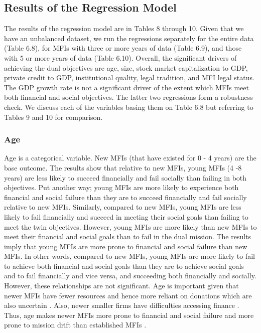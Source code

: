 \documentclass[a4paper, nobind]{templates/ociamthesis}
\begin{document}
\hypertarget{results-of-the-regression-model-1}{%
\subsection{Results of the Regression Model}\label{results-of-the-regression-model-1}}

The results of the regression model are in Tables 8 through 10. Given that we have an unbalanced dataset, we run the regressions separately for the entire data (Table 6.8), for MFIs with three or more years of data (Table 6.9), and those with 5 or more years of data (Table 6.10). Overall, the significant drivers of achieving the dual objectives are age, size, stock market capitalization to GDP, private credit to GDP, institutional quality, legal tradition, and MFI legal status. The GDP growth rate is not a significant driver of the extent which MFIs meet both financial and social objectives. The latter two regressions form a robustness check. We discuss each of the variables basing them on Table 6.8 but referring to Tables 9 and 10 for comparison.

\hypertarget{age-1}{%
\subsubsection{Age}\label{age-1}}

\noindent Age is a categorical variable. New MFIs (that have existed for 0 - 4 years) are the base outcome. The results show that relative to new MFIs, young MFIs (4 -8 years) are less likely to succeed financially and fail socially than failing in both objectives. Put another way; young MFIs are more likely to experience both financial and social failure than they are to succeed financially and fail socially relative to new MFIs. Similarly, compared to new MFIs, young MFIs are less likely to fail financially and succeed in meeting their social goals than failing to meet the twin objectives. However, young MFIs are more likely than new MFIs to meet their financial and social goals than to fail in the dual mission. The results imply that young MFIs are more prone to financial and social failure than new MFIs. In other words, compared to new MFIs, young MFIs are more likely to fail to achieve both financial and social goals than they are to achieve social goals and to fail financially and vice versa, and succeeding both financially and socially. However, these relationships are not significant. Age is important given that newer MFIs have fewer resources and hence more reliant on donations which are also uncertain \autocite{armendariz2013subsidy,d2013unsubsidized}. Also, newer smaller firms have difficulties accessing finance \autocite{beck2008finance}. Thus, age makes newer MFIs more prone to financial and social failure and more prone to mission drift than established MFIs \autocite{d2017ngos}.
\end{document}

